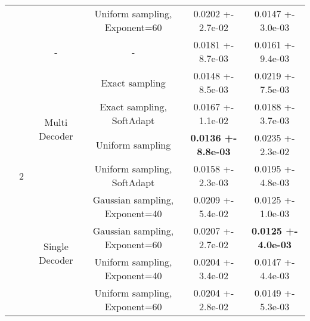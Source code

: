 \begin{tabular}{||c|c|c|c|c|c||}
\cline{4-6}
 &  &  & Uniform sampling, Exponent=60 & 0.0202 +- 2.7e-02 & 0.0147 +- 3.0e-03 \\
\cline{4-6}
\cline{3-6}
\cline{2-6}
 & \multirow{9}{*}{2} & \multirow{1}{*}{-} & - & 0.0181 +- 8.7e-03 & 0.0161 +- 9.4e-03 \\
\cline{4-6}
\cline{3-6}
 &  & \multirow{4}{*}{Multi Decoder} & Exact sampling & 0.0148 +- 8.5e-03 & 0.0219 +- 7.5e-03 \\
\cline{4-6}
 &  &  & Exact sampling, SoftAdapt & 0.0167 +- 1.1e-02 & 0.0188 +- 3.7e-03 \\
\cline{4-6}
 &  &  & Uniform sampling & \textbf{0.0136 +- 8.8e-03} & 0.0235 +- 2.3e-02 \\
\cline{4-6}
 &  &  & Uniform sampling, SoftAdapt & 0.0158 +- 2.3e-03 & 0.0195 +- 4.8e-03 \\
\cline{4-6}
\cline{3-6}
 &  & \multirow{4}{*}{Single Decoder} & Gaussian sampling, Exponent=40 & 0.0209 +- 5.4e-02 & 0.0125 +- 1.0e-03 \\
\cline{4-6}
 &  &  & Gaussian sampling, Exponent=60 & 0.0207 +- 2.7e-02 & \textbf{0.0125 +- 4.0e-03} \\
\cline{4-6}
 &  &  & Uniform sampling, Exponent=40 & 0.0204 +- 3.4e-02 & 0.0147 +- 4.4e-03 \\
\cline{4-6}
 &  &  & Uniform sampling, Exponent=60 & 0.0204 +- 2.8e-02 & 0.0149 +- 5.3e-03 \\
\cline{4-6}
\cline{3-6}
\cline{2-6}
\hline
\hline
\end{tabular}
